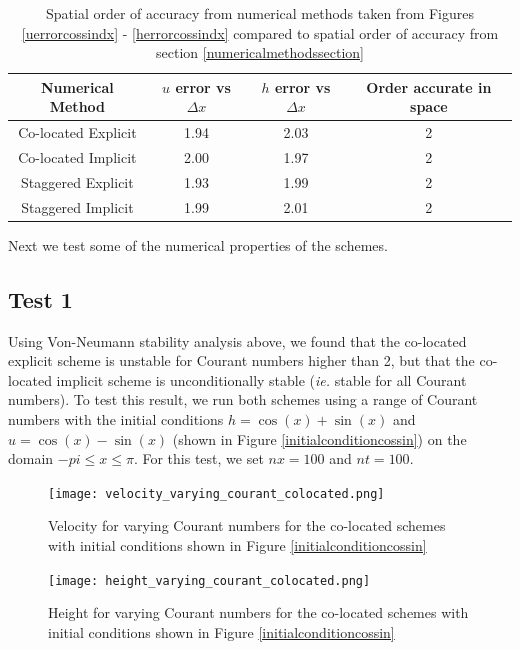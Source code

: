 \documentclass[a4paper, 10pt, notitlepage]{article}
\begin{document}
\begin{table}[H]
	\centering
	\begin{tabular}{|c | c| c| c|} 
		\hline
		\textbf{Numerical Method} & $u$ error vs $\Delta x$ &  $h$ error vs $\Delta x$ & Order accurate in space\\
		\hline
		Co-located Explicit & 1.94 & 2.03 & 2 \\ 
		\hline
		Co-located Implicit & 2.00 & 1.97 & 2 \\
		\hline
		Staggered Explicit & 1.93 & 1.99 & 2 \\
		\hline
		Staggered Implicit & 1.99 & 2.01 & 2 \\
		\hline
	\end{tabular}
	\caption{Spatial order of accuracy from numerical methods taken from Figures \ref{uerrorcossindx} - \ref{herrorcossindx} compared to spatial order of accuracy from section \ref{numericalmethodssection}}
	\label{gradientdx}
\end{table}

Next we test some of the numerical properties of the schemes.
\subsection{Test 1}
Using Von-Neumann stability analysis above, we found that the co-located explicit scheme is unstable for Courant numbers higher than 2, but that the co-located implicit scheme is unconditionally stable (\textit{ie.} stable for all Courant numbers). To test this result, we run both schemes using a range of Courant numbers with the initial conditions $h = \cos(x) + \sin(x)$ and $u = \cos(x) -\sin(x)$ (shown in Figure \ref{initialconditioncossin}) on the domain $-pi \leq x \leq \pi$. For this test, we set $nx = 100$ and $nt = 100$.

\begin{figure}[H]
	\begin{minipage}{.5\textwidth}
		\ContinuedFloat*
		\captionsetup{width=0.95\textwidth}
		\captionsetup{justification=centering}
		\texttt{[image: velocity\_varying\_courant\_colocated.png]}
		\caption{\label{velocity_varying_courant} Velocity for varying Courant numbers for the co-located schemes with initial conditions shown in Figure \ref{initialconditioncossin}}
	\end{minipage}
	\begin{minipage}{.5\textwidth}
	\ContinuedFloat
	\captionsetup{width=0.95\textwidth}
	\captionsetup{justification=centering}
	\texttt{[image: height\_varying\_courant\_colocated.png]}
	\caption{\label{height_varying_courant} Height for varying Courant numbers for the co-located schemes with initial conditions shown in Figure \ref{initialconditioncossin}} 
\end{minipage}
\end{figure}
\end{document}
